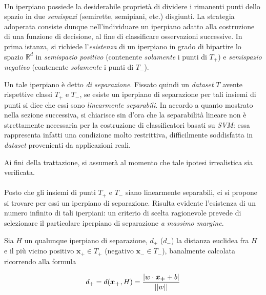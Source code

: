\paragraph{}
Un iperpiano possiede la desiderabile proprietà di dividere i rimanenti punti dello spazio in due \textit{semispazi} (semirette, semipiani, etc.) disgiunti. La strategia adoperata consiste dunque nell'individuare un iperpiano adatto alla costruzione di una funzione di decisione, al fine di classificare osservazioni successive. In prima istanza, si richiede l'\textit{esistenza} di un iperpiano in grado di bipartire lo spazio $\mathbb{R}^d$ in \textit{semispazio positivo} (contenente \textit{solamente} i punti di $T_+$) e \textit{semispazio negativo} (contenente \textit{solamente} i punti di $T_-$).

Un tale iperpiano è detto \textit{di separazione}.
Fissato quindi un \textit{dataset} $T$ avente rispettive classi $T_+$ e $T_-$, se esiste un iperpiano di separazione per tali insiemi di punti si dice che essi sono \textit{linearmente separabili}.
In accordo a quanto mostrato nella sezione successiva, si chiarisce sin d'ora che la separabilità lineare non è strettamente necessaria per la costruzione di classificatori basati su \textit{SVM}: essa rappresenta infatti una condizione molto restrittiva, difficilmente soddisfatta in \textit{dataset} provenienti da applicazioni reali.

Ai fini della trattazione, si assumerà al momento che tale ipotesi irrealistica sia verificata.

\paragraph{}
Posto che gli insiemi di punti $T_+$ e $T_-$ siano linearmente separabili, ci si propone si trovare per essi un iperpiano di separazione. Risulta evidente l'esistenza di un numero infinito di tali iperpiani: un criterio di scelta ragionevole prevede di selezionare il particolare iperpiano di separazione \textit{a massimo margine}.

Sia $H$ un qualunque iperpiano di separazione, $d_+$ ($d_-$) la distanza euclidea fra $H$ e il più vicino positivo $\boldsymbol{x_+} \in T_+$ (negativo $\boldsymbol{x_-} \in T_-$), banalmente calcolata ricorrendo alla formula 

\begin{equation}
	d_+ = d(\boldsymbol{x_+}, H) = \frac{|w \cdot \boldsymbol{x_+} + b|}{||w||}
	\vspace{2mm}
\end{equation}

